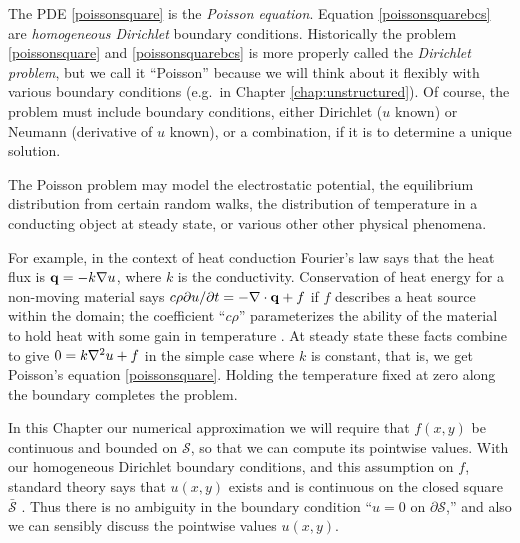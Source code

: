 The PDE \eqref{poissonsquare} is the \emph{Poisson equation}.  Equation \eqref{poissonsquarebcs} are \emph{homogeneous Dirichlet} boundary conditions.  Historically the problem \eqref{poissonsquare} and \eqref{poissonsquarebcs} is more properly called the \emph{Dirichlet problem}, but we call it ``Poisson'' because we will think about it flexibly with various boundary conditions (e.g.~in Chapter \ref{chap:unstructured}).  Of course, the problem must include boundary conditions, either Dirichlet ($u$ known) or Neumann (derivative of $u$ known), or a combination, if it is to determine a unique solution.

The Poisson problem may model the electrostatic potential, the equilibrium distribution from certain random walks, the distribution of temperature in a conducting object at steady state, or various other other physical phenomena.

For example, in the context of heat conduction Fourier's law says that the heat flux is $\mathbf{q} = -k \nabla u$, where $k$ is the conductivity.  Conservation of heat energy for a non-moving material says $c\rho \partial u/\partial t = - \nabla\cdot\mathbf{q} + f$ if $f$ describes a heat source within the domain; the coefficient ``$c\rho$'' parameterizes the ability of the material to hold heat with some gain in temperature \citep{Ockendonetal2003}.  At steady state these facts combine to give $0 = k \nabla^2 u + f$ in the simple case where $k$ is constant, that is, we get Poisson's equation \eqref{poissonsquare}.  Holding the temperature fixed at zero along the boundary completes the problem.

In this Chapter our numerical approximation we will require that $f(x,y)$ be continuous and bounded on $\mathcal{S}$, so that we can compute its pointwise values.  With our homogeneous Dirichlet boundary conditions, and this assumption on $f$, standard theory says that $u(x,y)$ exists and is continuous on the closed square $\bar{\mathcal{S}}$ \citep[Theorem 6 in section 5.6]{Evans}.  Thus there is no ambiguity in the boundary condition ``$u=0$ on $\partial \mathcal{S}$,'' and also we can sensibly discuss the pointwise values $u(x,y)$.


